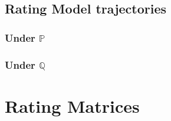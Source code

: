 \subsection{Rating Model trajectories}
\subsubsection{Under $\mathbb{P}$}
	
\subsubsection{Under $\mathbb{Q}$}
	
\appendix
\section{Rating Matrices}
	
\begin{table}[h!]
	\ratingMatricesMarketFOBBOne%
\centering
\ratingMatricesMarketFOBBOneCaption
\label{tab:ratingMatrix1}
\end{table}
\begin{table}[h!]
	\ratingMatricesMarketFOBBTwo%
\centering
\ratingMatricesMarketFOBBTwoCaption
\label{tab:ratingMatrix2}
\end{table}
\begin{table}[h!]
	\ratingMatricesMarketFOBBThree%
\centering
\ratingMatricesMarketFOBBThreeCaption
\label{tab:ratingMatrix3}
\end{table}
\begin{table}[h!]
	\ratingMatricesMarketFOBBFour%
\centering
\ratingMatricesMarketFOBBFourCaption
\label{tab:ratingMatrix4}
\end{table}
\begin{table}[h!]
	\ratingMatricesAdjustedFOBBOne%
\centering
\ratingMatricesAdjustedFOBBOneCaption
\label{tab:ratingMatrix5}
\end{table}
\begin{table}[h!]
	\ratingMatricesAdjustedFOBBTwo%
\centering
\ratingMatricesAdjustedFOBBTwoCaption
\label{tab:ratingMatrix6}
\end{table}
\begin{table}[h!]
	\ratingMatricesAdjustedFOBBThree%
\centering
\ratingMatricesAdjustedFOBBThreeCaption
\label{tab:ratingMatrix7}
\end{table}
\begin{table}[h!]
	\ratingMatricesAdjustedFOBBFour%
\centering
\ratingMatricesAdjustedFOBBFourCaption
\label{tab:ratingMatrix8}
\end{table}

